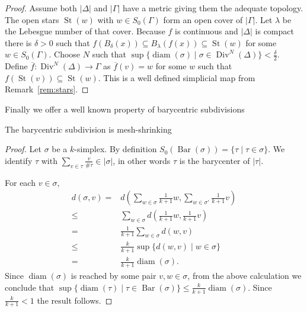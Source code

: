 \documentclass{standalone}
\begin{document}
	\begin{proof}
		Assume both $|\Delta|$ and $|\Gamma|$ have a metric giving them the adequate topology. The open stars $\operatorname{St}(w)$ with $w\in S_{0}(\Gamma)$ form an open cover of $|\Gamma|$. Let $\lambda$ be the Lebesgue number of that cover. Because $f$ is continuous and $|\Delta|$ is compact there is $\delta>0$ such that $f(B_{\delta}(x))\subseteq B_{\lambda}(f(x))\subseteq \operatorname{St}(w)$ for some $w\in S_{0}(\Gamma)$. Choose $N$ such that $\sup\{\operatorname{diam}(\sigma)\mid\sigma\in\operatorname{Div}^{N}(\Delta)\}<\frac{\delta}{2}$. Define $\overline{f}\colon\operatorname{Div}^{N}(\Delta)\rightarrow\Gamma$ as $\overline{f}(v)=w$ for some $w$ such that $f(\operatorname{St}(v))\subseteq \operatorname{St}(w)$. This is a well defined simplicial map from Remark~\ref{rem:stars}.
	\end{proof}
	Finally we offer a well known property of barycentric subdivisions \cite[Theorem 15.4]{munkres:1984:algebraic:topology}
	\begin{proposition}\label{prop:bar_mesh}
		The barycentric subdivision is mesh-shrinking
	\end{proposition}
	
	\begin{proof}
		Let $\sigma$ be a $k$-simplex. By definition $S_{0}(\operatorname{Bar}(\sigma))=\{\tau\mid\tau\in \sigma\}$. We identify $\tau$ with $\sum_{v\in\tau}\frac{v}{\#\tau}\in|\sigma|$, in other words $\tau$ is the barycenter of $|\tau|$.
		
		For each $v\in \sigma$, \begin{align}
			d(\sigma,v)=&d(\sum_{w\in\sigma}\frac{1}{k+1}w,\sum_{w\in\sigma'}\frac{1}{k+1}v)\\
			\leq& \sum_{w\in\sigma}d(\frac{1}{k+1}w,\frac{1}{k+1}v)\\
			=&\frac{1}{k+1}\sum_{w\in\sigma}d(w,v)\\
			\leq&\frac{k}{k+1}\sup\{d(w,v)\mid w\in\sigma\}\\
			=&\frac{k}{k+1}\operatorname{diam}(\sigma).		
		\end{align}
		Since $\operatorname{diam}(\sigma)$ is reached by some pair $v,w\in\sigma$, from the above calculation we conclude that $\sup\{\operatorname{diam}(\tau)\mid\tau\in\operatorname{Bar}(\sigma)\}\leq\frac{k}{k+1}\operatorname{diam}(\sigma)$. Since $\frac{k}{k+1}<1$ the result follows.
	\end{proof}
\end{document}
